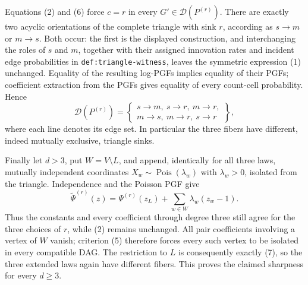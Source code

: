 Equations (2) and (6) force \(c=r\) in every \(G'\in\mathcal D(P^{(r)})\).  There are exactly two acyclic orientations of the complete triangle with sink \(r\), according as \(s\to m\) or \(m\to s\).  Both occur: the first is the displayed construction, and interchanging the roles of \(s\) and \(m\), together with their assigned innovation rates and incident edge probabilities in \texttt{def:triangle-witness}, leaves the symmetric expression (1) unchanged.  Equality of the resulting log-PGFs implies equality of their PGFs; coefficient extraction from the PGFs gives equality of every count-cell probability.  Hence
\[
\mathcal D(P^{(r)})=
\left\{
\begin{array}{l}
s\to m,\ s\to r,\ m\to r,\\
m\to s,\ m\to r,\ s\to r
\end{array}
\right\},
\tag{7}
\]
where each line denotes its edge set.  In particular the three fibers have different, indeed mutually exclusive, triangle sinks.

Finally let \(d>3\), put \(W=V\setminus L\), and append, identically for all three laws, mutually independent coordinates \(X_w\sim\operatorname{Pois}(\lambda_w)\) with \(\lambda_w>0\), isolated from the triangle.  Independence and the Poisson PGF give
\[
\widetilde\Psi^{(r)}(z)
=\Psi^{(r)}(z_L)+\sum_{w\in W}\lambda_w(z_w-1).
\tag{8}
\]
Thus the constants and every coefficient through degree three still agree for the three choices of \(r\), while (2) remains unchanged.  All pair coefficients involving a vertex of \(W\) vanish; criterion (5) therefore forces every such vertex to be isolated in every compatible DAG.  The restriction to \(L\) is consequently exactly (7), so the three extended laws again have different fibers.  This proves the claimed sharpness for every \(d\geq3\).
